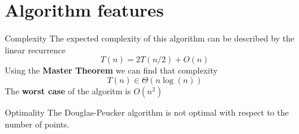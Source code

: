 \documentclass[10pt]{beamer}
\begin{document}
\section{Algorithm features}

\begin{frame}{Complexity}
	The expected complexity of this algorithm can be described by the linear recurrence
	$$
		T(n) = 2 T(n/2)+O(n)
	$$
	Using the \textbf{Master Theorem} we can find that complexity 
	$$
		T(n) \in \Theta(n \log(n))
	$$ 
	The \textbf{worst case} of the algoritm is $O(n^2)$	  
\end{frame}

\begin{frame}{Optimality}
	The Douglas-Peucker algorithm is not optimal with respect to the number of points.
	\begin{figure}[h]
		\begin{minipage}[h]{0.49\linewidth}
		\end{minipage}
		\hfill
		\begin{minipage}[h]{0.49\linewidth}

\end{minipage}
\end{figure}
\end{frame}
\end{document}
